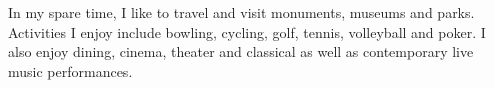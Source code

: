 
\begin{cvparagraph}
In my spare time, I like to travel and visit monuments, museums and parks. Activities I enjoy include bowling, cycling, golf, tennis, volleyball and poker. I also enjoy dining, cinema, theater and classical as well as contemporary live music performances.
\end{cvparagraph}

